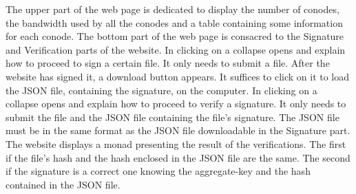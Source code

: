\documentclass[11pt, a4paper, twoside, openright, openany]{article}
\begin{document}
The upper part of the web page is dedicated to display the number of conodes, the bandwidth used by all the conodes and
a table containing some information for each conode.
\newline \newline
The bottom part of the web page is consacred to the Signature and Verification parts of the website.
\newline \newline
In clicking on  a collapse opens and explain how to proceed to sign a certain file.
It only needs to submit a file. After the website has signed it, a download button appears.
It suffices to click on it to load the JSON file, containing the signature, on the computer.
\newline \newline
In clicking on  a collapse opens and explain how to proceed to verify a signature.
It only needs to submit the file and the JSON file containing the file's signature.
The JSON file must be in the same format as the JSON file downloadable in the Signature part.
\newline
The website displays a monad presenting the result of the verifications. The first if the file's hash and the hash enclosed in the JSON file are the same.
The second if the signature is a correct one knowing the aggregate-key and the hash contained in the JSON file.
\bigbreak

\clearpage
\begingroup
\let\cleardoublepage\clearpage


\endgroup
\end{document}
